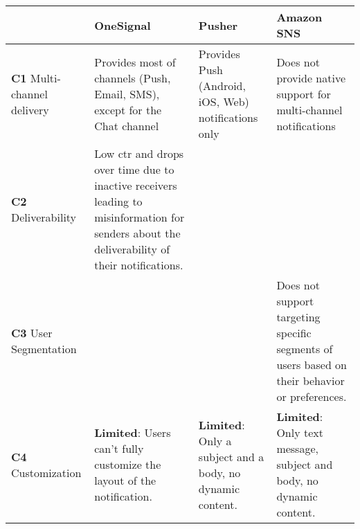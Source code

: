 \begin{table}[hbt!]
      \centering
      \begin{tabularx}{\textwidth}{ |
                  >{\raggedright\arraybackslash} X |
                  >{\raggedright\arraybackslash} X |
                  >{\raggedright\arraybackslash} X |
                  >{\raggedright\arraybackslash} X |
            }
            \hline
                                                          & \textbf{OneSignal}                                                                                                                                      & \textbf{Pusher}                                                       & \textbf{Amazon SNS}                                                                           \\
            \hline
            \textbf{C1} \linebreak Multi-channel delivery & Provides most of channels (Push, Email, SMS), except for the Chat channel                                                                               & Provides Push
            (Android, iOS, Web) notifications only
                                                          & Does not provide native support for multi-channel notifications                                                                                                                                                                                                                                                                 \\
            \hline
            \textbf{C2} \linebreak Deliverability         & Low \acrshort{ctr} and drops over time due to inactive receivers leading to misinformation for senders about the deliverability of their notifications. &                                                                       &                                                                                               \\
            \hline
            \textbf{C3} \linebreak User Segmentation      &                                                                                                                                                         &                                                                       & Does not support targeting specific segments of users based on their behavior or preferences. \\
            \hline
            \textbf{C4} \linebreak Customization          & \textbf{Limited}: Users can’t fully customize the layout of the notification.                                                                           & \textbf{Limited}: Only a subject and a body, no dynamic content.      & \textbf{Limited}: Only text message, subject and body, no dynamic content.

\end{tabularx}
\end{table}
